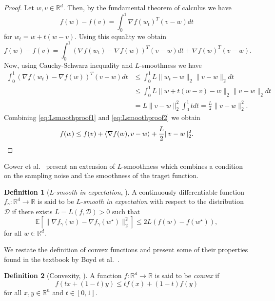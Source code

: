 \documentclass[12pt]{article}
\theoremstyle{definition}
\newtheorem{definition}[definition]{Definition}
\numberwithin{equation}{section}
\newcommand{\R}{\mathbb{R}}
\newcommand{\norm}[1]{\lVert{#1}\rVert_2}
\begin{document}
\begin{proof}
  Let $w, v \in \R^d$. Then, by the fundamental theorem of calculus we have
  $$
  f(w) - f(v) = \int_0^1 \nabla f(w_t)^T(v-w)dt 
  $$
  for $w_t = w + t(w-v)$.
  Using this equality we obtain
  \begin{equation}
    \label{eq:Lsmoothproof1}
    f(w) - f(v) = \int_0^1 (\nabla f(w_t) - \nabla f(w))^T(v-w)dt + \nabla f(w)^T(v-w).
  \end{equation}
  Now, using Cauchy-Schwarz inequality and $L$-smoothness we have
  \begin{equation}
    \label{eq:Lsmoothproof2}
    \begin{split}
      \int_0^1 (\nabla f(w_t) - \nabla f(w))^T(v-w)dt &\leq \int_0^1 L \norm{w_t-w} \norm{v-w}dt \\
      &\leq \int_0^1 L \norm{w + t(w - v) -w} \norm{v-w}dt \\
      &= L \norm{v-w}^2 \int_0^1 t dt = \frac{L}{2} \norm{v-w}^2.
    \end{split}
  \end{equation}
  Combining \eqref{eq:Lsmoothproof1} and \eqref{eq:Lsmoothproof2} we obtain
  \begin{equation*}
    f(w) \leq f(v) + \langle \nabla f(w), v - w \rangle + \frac{L}{2} \norm{v - w}^2. \qedhere
  \end{equation*}
\end{proof}
Gower et al.\ \cite{gowerSGDGeneralAnalysis2019} present an extension of $L$-smoothness which combines a condition on the sampling noise and the smoothness of the traget function.
\begin{definition}[$L$-\emph{smooth in expectation}, ]
  A continuously differentiable  function $f_{\gamma}:\R^d \rightarrow \R$ is said to be $L$-\emph{smooth in expectation} with respect to the distribution $\mathcal{D}$ if there exists $L = L(f, \mathcal{D}) > 0$ such that 
  \begin{equation}
    \mathbb{E}[\norm{\nabla f_{\gamma}(w) - \nabla f_{\gamma}(w^\star)}^2] \leq 2 L(f(w) - f(w^\star)),
  \end{equation}
  for all $w \in \R^d$. 
\end{definition}
We restate the definition of convex functions and present some of their properties found in the textbook by Boyd et al.\ \cite{boydConvexOptimization2004}.
\begin{definition}[Convexity, ]
  A function $f : \R^d \rightarrow \R$ is said to be \emph{convex} if 
  \begin{equation}
    f(tx+(1-t)y) \leq tf(x)+(1-t)f(y)
  \end{equation}
  for all $x,y \in \R^n$ and $t \in [0,1]$.
\end{definition}
\end{document}
